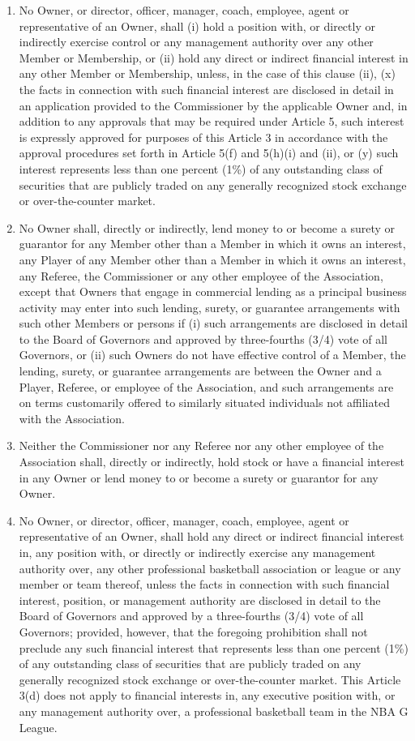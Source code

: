 \documentclass[]{book}
\providecommand{\tightlist}{%
  \setlength{\itemsep}{0pt}\setlength{\parskip}{0pt}}
\begin{document}
\begin{enumerate}
\def\labelenumi{(\alph{enumi})}
\tightlist
\item
  No Owner, or director, officer, manager, coach, employee, agent or representative of an Owner, shall (i) hold a position with, or directly or indirectly exercise control or any management authority over any other Member or Membership, or (ii) hold any direct or indirect financial interest in any other Member or Membership, unless, in the case of this clause (ii), (x) the facts in connection with such financial interest are disclosed in detail in an application provided to the Commissioner by the applicable Owner and, in addition to any approvals that may be required under Article 5, such interest is expressly approved for purposes of this Article 3 in accordance with the approval procedures set forth in Article 5(f) and 5(h)(i) and (ii), or (y) such interest represents less than one percent (1\%) of any outstanding class of securities that are publicly traded on any generally recognized stock exchange or over-the-counter market.
\item
  No Owner shall, directly or indirectly, lend money to or become a surety or guarantor for any Member other than a Member in which it owns an interest, any Player of any Member other than a Member in which it owns an interest, any Referee, the Commissioner or any other employee of the Association, except that Owners that engage in commercial lending as a principal business activity may enter into such lending, surety, or guarantee arrangements with such other Members or persons if (i) such arrangements are disclosed in detail to the Board of Governors and approved by three-fourths (3/4) vote of all Governors, or (ii) such Owners do not have effective control of a Member, the lending, surety, or guarantee arrangements are between the Owner and a Player, Referee, or employee of the Association, and such arrangements are on terms customarily offered to similarly situated individuals not affiliated with the Association.
\item
  Neither the Commissioner nor any Referee nor any other employee of the Association shall, directly or indirectly, hold stock or have a financial interest in any Owner or lend money to or become a surety or guarantor for any Owner.
\item
  No Owner, or director, officer, manager, coach, employee, agent or representative of an Owner, shall hold any direct or indirect financial interest in, any position with, or directly or indirectly exercise any management authority over, any other professional basketball association or league or any member or team thereof, unless the facts in connection with such financial interest, position, or management authority are disclosed in detail to the Board of Governors and approved by a three-fourths (3/4) vote of all Governors; provided, however, that the foregoing prohibition shall not preclude any such financial interest that represents less than one percent (1\%) of any outstanding class of securities that are publicly traded on any generally recognized stock exchange or over-the-counter market. This Article 3(d) does not apply to financial interests in, any executive position with, or any management authority over, a professional basketball team in the NBA G League.

\end{enumerate}
\end{document}

